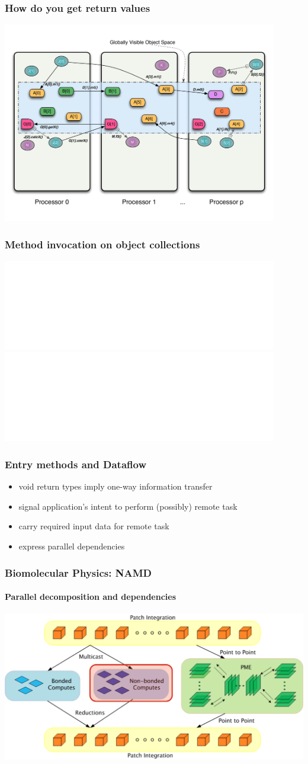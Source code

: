 \begin{frame}
\frametitle{How do you get return values}
	\begin{center}
        \includegraphics[width=0.9\textwidth]{../figures/progmodel/13-rmi-return-values.pdf}
	\end{center}
\end{frame}


\begin{frame}
\frametitle{Method invocation on object collections}
	\begin{center}
        \includegraphics<1>[width=0.9\textwidth]{../figures/progmodel/13-rmi-return-values.pdf}
        \includegraphics<2>[width=0.9\textwidth]{../figures/progmodel/14-rmi-collective.pdf}
	\end{center}
\end{frame}


\begin{frame}
\frametitle{Entry methods and Dataflow}
    \begin{itemize}[<+->]
        \item void return types imply one-way information transfer
        \item signal application's intent to perform (possibly) remote task
        \item carry required input data for remote task
        \item express parallel dependencies
    \end{itemize}
\end{frame}


\begin{frame}
\frametitle{Biomolecular Physics: NAMD}
\framesubtitle{Parallel decomposition and dependencies}
\includegraphics[width=\textwidth]{../figures/md_parallelize.pdf}
\end{frame}


